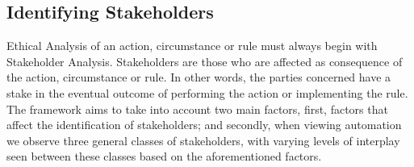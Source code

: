 \subsection{Identifying Stakeholders}
\label{sec:-identify}
Ethical Analysis of an action, circumstance or rule must always begin with Stakeholder Analysis. Stakeholders are those who are affected as consequence of the action, circumstance or rule. In other words, the parties concerned have a stake in the eventual outcome of performing the action or implementing the rule.\\
The framework aims to take into account two main factors, first, factors that affect the identification of stakeholders; and secondly, when viewing automation we observe three general classes of stakeholders, with varying levels of interplay seen between these classes based on the aforementioned factors.
